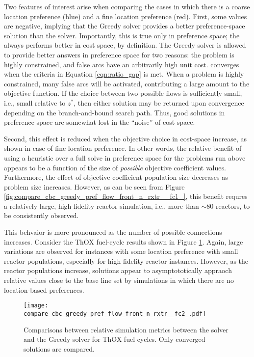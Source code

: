Two features of interest arise when comparing the cases in which there is a
coarse location preference (blue) and a fine location preference (red). First,
some values are negative, implying that the Greedy solver provides a better
preference-space solution than the \cbc solver. Importantly, this is true only
in preference space; the \cbc always performs better in cost space, by
definition. The Greedy solver is allowed to provide better answers in preference
space for two reasons: the problem is highly constrained, and false arcs have an
arbitrarily high unit cost. \cbc converges when the criteria in Equation
\ref{eqn:ratio_gap} is met. When a problem is highly constrained, many false
arcs will be activated, contributing a large amount to the objective
function. If the choice between two possible flows is sufficiently small, i.e.,
small relative to $z^*$, then either solution may be returned upon convergence
depending on the branch-and-bound search path. Thus, good solutions in
preference-space are somewhat lost in the ``noise'' of cost-space.

Second, this effect is reduced when the objective choice in cost-space increase,
as shown in case of fine location preference. In other words, the relative
benefit of using a heuristic over a full \cbc solve in preference space for the
problems run above appears to be a function of the size of \textit{possible}
objective coefficient values. Furthermore, the effect of objective coefficient
population size decreases as problem size increases. However, as can be seen
from Figure \ref{fig:compare_cbc_greedy_pref_flow_front_n_rxtr__fc1_}, this
benefit requres a relatively large, high-fidelity reactor simulation, i.e., more
than $\sim$80 reactors, to be consistently observed. 

This behvaior is more pronounced as the number of possible connections
increases. Consider the ThOX fuel-cycle results shown in Figure
\ref{fig:compare_cbc_greedy_pref_flow_front_n_rxtr__fc2_}. Again, large
variations are observed for instances with some location preference with small
reactor populations, especially for high-fidelity reactor instances. However, as
the reactor populations increase, \cbc solutions appear to asymptototically
appraoch relative values close to the base line set by simulations in which
there are no location-based preferences.

\begin{figure}[h!]
  \begin{center}
    \texttt{[image: compare\_cbc\_greedy\_pref\_flow\_front\_n\_rxtr\_\_fc2\_.pdf]}
    \caption{
      \label{fig:compare_cbc_greedy_pref_flow_front_n_rxtr__fc2_}
      Comparisons between relative simulation metrics between the \cbc solver and
      the Greedy solver for ThOX fuel cycles. Only converged \cbc
      solutions are compared.  }
  \end{center}
\end{figure}

